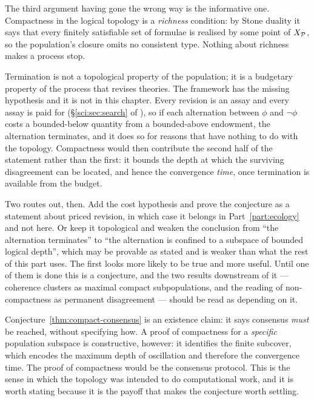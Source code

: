 \begin{remark}
\label{rmk:consensus-missing}
The third argument having gone the wrong way is the informative one.
Compactness in the logical topology is a \emph{richness} condition: by
Stone duality it says that every finitely satisfiable set of formulae
is realised by some point of $X_{\mathcal{P}}$, so the population's closure
omits no consistent type.
Nothing about richness makes a process stop.

Termination is not a topological property of the population; it is a
budgetary property of the process that revises theories.
The framework has the missing hypothesis and it is not in this chapter.
Every revision is an assay and every assay is paid for
(\S\ref{sci:sec:search} of \chSci), so if each alternation between
$\phi$ and $\neg\phi$ costs a bounded-below quantity from a
bounded-above endowment, the alternation terminates, and it does so for
reasons that have nothing to do with the topology.
Compactness would then contribute the second half of the statement
rather than the first: it bounds the depth at which the surviving
disagreement can be located, and hence the convergence \emph{time},
once termination is available from the budget.

Two routes out, then.
Add the cost hypothesis and prove the conjecture as a statement about
priced revision, in which case it belongs in
Part~\ref{part:ecology} and not here.
Or keep it topological and weaken the conclusion from ``the
alternation terminates'' to ``the alternation is confined to a
subspace of bounded logical depth'', which may be provable as stated
and is weaker than what the rest of this part uses.
The first looks more likely to be true and more useful.
Until one of them is done this is a conjecture, and the two results
downstream of it --- coherence clusters as maximal compact
subpopulations, and the reading of non-compactness as permanent
disagreement --- should be read as depending on it.
\end{remark}

\begin{remark}
Conjecture~\ref{thm:compact-consensus} is an existence claim:
it says consensus \emph{must} be reached, without specifying how.
A proof of compactness for a \emph{specific} population subspace is
constructive, however: it identifies the finite subcover, which encodes
the maximum depth of oscillation and therefore the convergence time.
The proof of compactness would be the consensus protocol.
This is the sense in which the topology was intended to do
computational work, and it is worth stating because it is the payoff
that makes the conjecture worth settling.
\end{remark}

